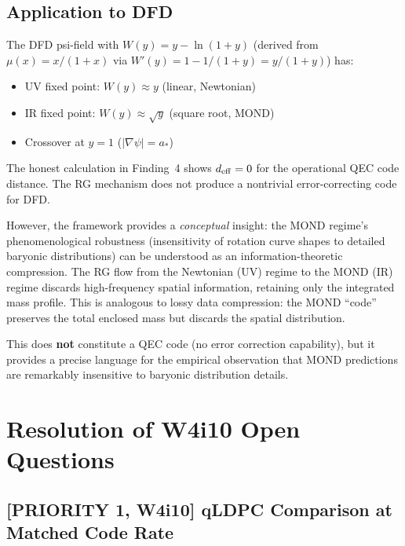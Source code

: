 \documentclass[11pt]{article}
\theoremstyle{definition}
\theoremstyle{remark}
\begin{document}
\subsection{Application to DFD}
\label{sec:rg-dfd}

The DFD psi-field with $W(y) = y - \ln(1+y)$ (derived from
$\mu(x) = x/(1+x)$ via $W'(y) = 1 - 1/(1+y) = y/(1+y)$) has:

\begin{itemize}[nosep]
  \item UV fixed point: $W(y) \approx y$ (linear, Newtonian)
  \item IR fixed point: $W(y) \approx \sqrt{y}$ (square root, MOND)
  \item Crossover at $y = 1$ ($|\nabla\psi| = a_*$)
\end{itemize}

The honest calculation in Finding~4 shows $d_{\rm eff} = 0$ for the
operational QEC code distance.  The RG mechanism does not produce a
nontrivial error-correcting code for DFD.

However, the framework provides a \emph{conceptual} insight: the MOND
regime's phenomenological robustness (insensitivity of rotation curve
shapes to detailed baryonic distributions) can be understood as an
information-theoretic compression.  The RG flow from the Newtonian
(UV) regime to the MOND (IR) regime discards high-frequency spatial
information, retaining only the integrated mass profile.  This is
analogous to lossy data compression: the MOND ``code'' preserves the
total enclosed mass but discards the spatial distribution.

This does \textbf{not} constitute a QEC code (no error correction
capability), but it provides a precise language for the empirical
observation that MOND predictions are remarkably insensitive to
baryonic distribution details.

\section{Resolution of W4i10 Open Questions}
\label{sec:open-resolution}

\subsection{[PRIORITY 1, W4i10] qLDPC Comparison at Matched Code Rate}
\end{document}
